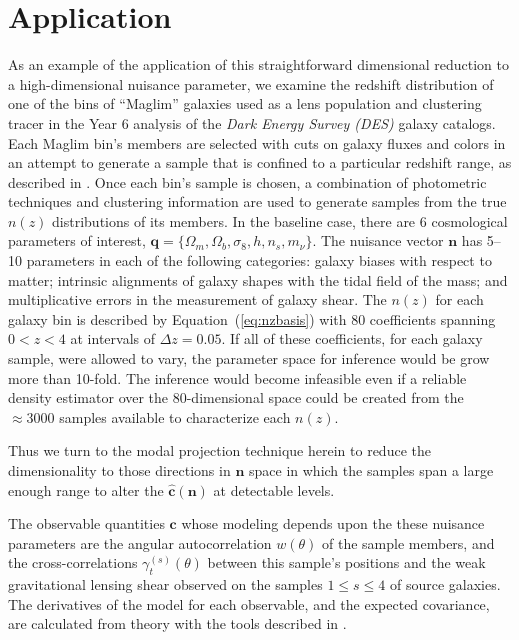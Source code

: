 \documentclass[linenumbers, onecolumn]{aastex63}
\newcommand{\eqq}[1]{Equation~(\ref{#1})}
\newcommand{\vecc}{\ensuremath{\mathbf{c}}}
\newcommand{\vecq}{\ensuremath{\mathbf{q}}}
\newcommand{\vecn}{\ensuremath{\mathbf{n}}}
\newcommand{\hatc}{\ensuremath{\hat{\mathbf{c}}}}
\begin{document}
\section{Application}\label{sec:app}
As an example of the application of this straightforward dimensional
reduction to a high-dimensional nuisance parameter, we examine the
redshift distribution of one of the bins of ``Maglim''  galaxies used
as a lens population and clustering tracer in the Year 6 analysis of
the \textit{Dark Energy Survey (DES)} galaxy catalogs.  Each
Maglim bin's members are selected with cuts on galaxy fluxes and
colors in an attempt  to generate a sample that is confined to a
particular redshift range, as described in \citet{y6gg}.  Once each bin's
sample is chosen, a combination of 
photometric techniques \citep{y6pz} and clustering information
\citep{y6wz} are used to generate samples from the true $n(z)$
distributions of its members.
In the baseline case,
there are 6 cosmological parameters of interest, $\vecq = \{\Omega_m,
\Omega_b, \sigma_8, h, n_s, m_\nu\}.$   The nuisance vector $\vecn$
has 5--10 parameters in each of the following categories: galaxy
biases with respect to matter; intrinsic alignments of galaxy shapes
with the tidal field of the mass; and multiplicative errors in the
measurement of galaxy shear.  The $n(z)$ for each galaxy bin
is
described by \eqq{eq:nzbasis} with 80 coefficients spanning $0<z<4$ at
intervals of $\Delta z=0.05.$ If all of these coefficients, for each
galaxy sample, were allowed to vary, the parameter space for inference would be grow more
than 10-fold.  The inference would become infeasible even if a
reliable density estimator over the 80-dimensional space could be
created from the $\approx3000$ samples available to characterize each
$n(z).$ 

Thus we turn to the modal projection technique herein to reduce the
dimensionality to those directions in $\vecn$ space in which the samples span a large
enough range to alter the $\hatc(\vecn)$ at detectable levels. 

The observable quantities $\vecc$ whose modeling depends upon the these nuisance
parameters are the angular autocorrelation $w(\theta)$ of the sample
members, and the cross-correlations $\gamma_t^{(s)}(\theta)$ between
this sample's positions and the weak gravitational lensing shear
observed on the samples $1\le s \le 4$ of source galaxies.  The
derivatives of the model for each observable, and the expected
covariance, are calculated from theory with the tools described in
\citet{y6model}.
\end{document}
